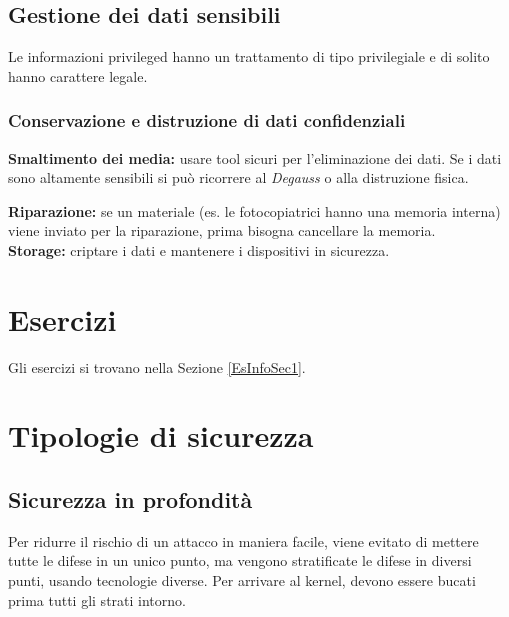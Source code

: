 \subsection{Gestione dei dati sensibili}

Le informazioni privileged hanno un trattamento di tipo privilegiale e di
solito hanno carattere legale.

\subsubsection{Conservazione e distruzione di dati confidenziali}

\textbf{Smaltimento dei media:} usare tool sicuri per l'eliminazione dei dati.
Se i dati sono altamente sensibili si può ricorrere al \textit{Degauss} o alla
distruzione fisica.\\
\newline

\textbf{Riparazione:} se un materiale (es. le fotocopiatrici hanno una memoria
interna) viene inviato per la riparazione, prima bisogna cancellare la memoria.
\\
\newline
\textbf{Storage:} criptare i dati e mantenere i dispositivi in sicurezza.

\section{Esercizi}

Gli esercizi si trovano nella Sezione \ref{EsInfoSec1}.

\section{Tipologie di sicurezza}

\subsection{Sicurezza in profondità}

Per ridurre il rischio di un attacco in maniera facile, viene evitato di
mettere tutte le difese in un unico punto, ma vengono stratificate le difese in
diversi punti, usando tecnologie diverse.
Per arrivare al kernel, devono essere bucati prima tutti gli strati intorno.
